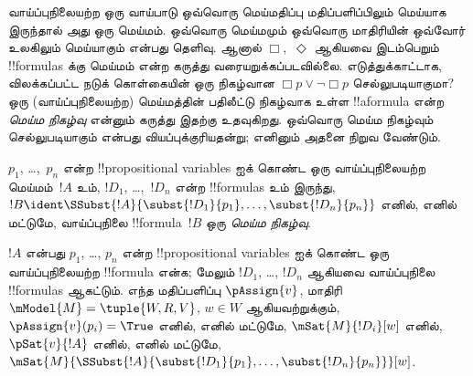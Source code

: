 \documentclass[../../../include/open-logic-section]{subfiles}
\begin{document}


\begin{explain}
வாய்ப்புநிலையற்ற ஒரு வாய்பாடு ஒவ்வொரு மெய்மதிப்பு மதிப்பளிப்பிலும்
மெய்யாக இருந்தால் அது ஒரு மெய்மம். ஒவ்வொரு மெய்மமும் ஒவ்வொரு மாதிரியின்
ஒவ்வோர் உலகிலும் மெய்யாகும் என்பது தெளிவு. ஆனால் $\Box$,~$\Diamond$
ஆகியவை இடம்பெறும் !!{formula}s க்கு மெய்மம் என்ற கருத்து
வரையறுக்கப்படவில்லை. எடுத்துக்காட்டாக, விலக்கப்பட்ட நடுக் கொள்கையின் ஒரு
நிகழ்வான $\Box p \lor \lnot \Box p$ செல்லுபடியாகுமா? ஒரு
(வாய்ப்புநிலையற்ற) மெய்மத்தின் பதிலீட்டு நிகழ்வாக உள்ள !!a{formula} என்ற
\emph{மெய்ம நிகழ்வு} என்னும் கருத்து இதற்கு உதவுகிறது. ஒவ்வொரு மெய்ம
நிகழ்வும் செல்லுபடியாகும் என்பது வியப்புக்குரியதன்று; எனினும் அதனை
நிறுவ வேண்டும்.
\end{explain}

\begin{defn}
  $p_1$, \dots,~$p_n$ என்ற !!{propositional variable}s ஐக் கொண்ட ஒரு
  வாய்ப்புநிலையற்ற மெய்மம்~$!A$ உம், $!D_1$, \dots,~$!D_n$ என்ற
  !!{formula}s உம் இருந்து, $!B \ident
  \SSubst{!A}{\subst{!D_1}{p_1}, \dots, \subst{!D_n}{p_n}}$ எனில்,
  எனில் மட்டுமே, வாய்ப்புநிலை !!{formula}~$!B$ ஒரு \emph{மெய்ம நிகழ்வு}.
\end{defn}

\begin{lem}
  $!A$ என்பது $p_1$, \dots, $p_n$ என்ற !!{propositional variable}s ஐக்
  கொண்ட ஒரு வாய்ப்புநிலையற்ற !!{formula} என்க; மேலும் $!D_1$, \dots,
  $!D_n$ ஆகியவை வாய்ப்புநிலை !!{formula}s ஆகட்டும். எந்த
  மதிப்பளிப்பு $\pAssign{v}$, மாதிரி $\mModel{M} = \tuple{W, R, V}$,
  $w \in W$ ஆகியவற்றுக்கும், $\pAssign{v}(p_i) = \True$ எனில், எனில்
  மட்டுமே, $\mSat{M}{!D_i}[w]$ எனில், $\pSat{v}{!A}$ எனில், எனில்
  மட்டுமே,
  $\mSat{M}{\SSubst{!A}{\subst{!D_1}{p_1}, \dots,
      \subst{!D_n}{p_n}}}[w]$.
\end{lem}
\end{document}
